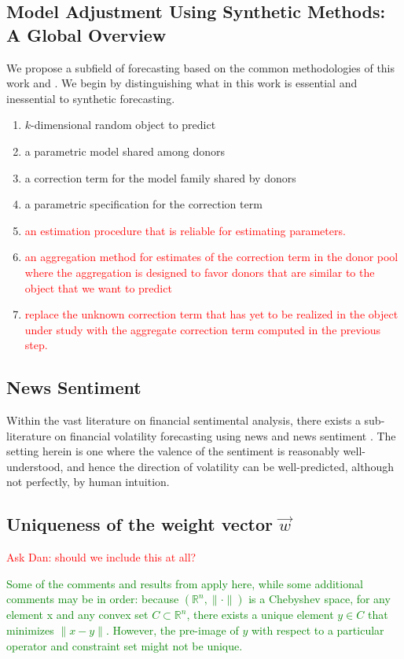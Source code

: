 \documentclass[11pt]{article}
\theoremstyle{definition}
\begin{document}
\subsection{Model Adjustment Using Synthetic Methods: A Global Overview}

We propose a subfield of forecasting based on the common methodologies of this work and \citet{lin2021minimizing}.  We begin by distinguishing what in this work is essential and inessential to synthetic forecasting.

\begin{enumerate}
  \item $k$-dimensional random object to predict
  \item a parametric model shared among donors
  \item a correction term for the model family shared by donors
  \item a parametric specification for the correction term
  \item \textcolor{red}{an estimation procedure that is reliable for estimating parameters.}
  \item \textcolor{red}{an aggregation method for estimates of the correction term in the donor pool where the aggregation is designed to favor donors that are similar to the object that we want to predict}
  \item \textcolor{red}{replace the unknown correction term that has yet to be realized in the object under study with the aggregate correction term computed in the previous step.}
\end{enumerate}

\subsection{News Sentiment}
Within the vast literature on financial sentimental analysis, there exists a sub-literature on financial volatility forecasting using news and news sentiment \citep{atkins2018financial}.  The setting herein is one where the valence of the sentiment is reasonably well-understood, and hence the direction of volatility can be well-predicted, although not perfectly, by human intuition.

\subsection{Uniqueness of the weight vector $\vec{w}$}
\textcolor{red}{Ask Dan: should we include this at all?}

\textcolor{green}{Some of the comments and results from \cite{lin2021minimizing} apply here, while some additional comments may be in order: because $(\mathbb{R}^{n}, \|\cdot\|)$ is a Chebyshev space, for any element x and any convex set $C\subset \mathbb{R}^{n}$, there exists a unique element $y\in C$ that minimizes $\|x-y\|$.  However, the pre-image of $y$ with respect to a particular operator and constraint set might not be unique.}
\end{document}
